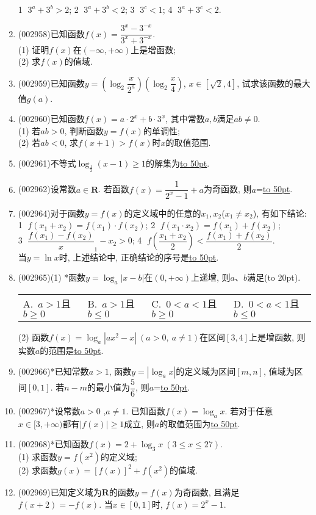 \documentclass[10pt,a4paper]{article}
\newcommand{\blank}[1]{\underline{\hbox to #1pt{}}}
\newcommand{\bracket}[1]{(\hbox to #1pt{})}
\newcommand{\fourch}[4]{\par\begin{tabular}{p{.23\textwidth}p{.23\textwidth}p{.23\textwidth}p{.23\textwidth}}
A.~#1 &B.~#2& C.~#3& D.~#4
\end{tabular}}
\begin{document}
\begin{enumerate}[1.]
\textcircled{1} $3^a+3^b>2$; \textcircled{2} $3^a+3^b<2$; \textcircled{3} $3^c<1$; \textcircled{4} $3^a+3^c<2$.
\item {\tiny (002958)}已知函数$f(x)=\dfrac{3^x-3^{-x}}{3^x+3^{-x}}$.\\
(1) 证明$f(x)$在$(-\infty,+\infty)$上是增函数;\\
(2) 求$f(x)$的值域.
\item {\tiny (002959)}已知函数$y=(\log_2\dfrac x{2^a})(\log_2\dfrac x4)$, $x\in [\sqrt 2,4]$, 试求该函数的最大值$g(a)$.
\item {\tiny (002960)}已知函数$f(x)=a\cdot 2^x+b\cdot 3^x$, 其中常数$a,b$满足$ab\ne 0$.\\
(1) 若$ab>0$, 判断函数$y=f(x)$的单调性;\\
(2) 若$ab<0$, 求$f(x+1)>f(x)$时$x$的取值范围.
\item {\tiny (002961)}不等式$\log_{\frac 12}(x-1)\ge 1$的解集为\blank{50}.
\item {\tiny (002962)}设常数$a\in \mathbf{R}$. 若函数$f(x)=\dfrac 1{2^x-1}+a$为奇函数, 则$a$=\blank{50}.
\item {\tiny (002964)}对于函数$y=f(x)$的定义域中的任意的$x_1,x_2$($x_1\ne x_2$), 有如下结论:\\
\textcircled{1} $f(x_1+x_2)=f(x_1)\cdot f(x_2)$; \textcircled{2} $f(x_1\cdot x_2)=f(x_1)+f(x_2)$;\\ \textcircled{3} $\dfrac{f(x_1)-f(x_2)}x_1-x_2>0$; \textcircled{4} $f(\dfrac{x_1+x_2}2)<\dfrac{f(x_1)+f(x_2)}2$. 
\\当$y=\ln x$时, 上述结论中, 正确结论的序号是\blank{50}.
\item {\tiny (002965)}(1) *函数$y=\log_a|x-b|$在$(0,+\infty)$上递增, 则$a$、$b$满足\bracket{20}.
\fourch{$a>1$且$b\ge 0$}{$a>1$且$b\le 0$}{$0<a<1$且$b\ge 0$}{$0<a<1$且$b\le 0$}
(2) 函数$f(x)=\log_a|ax^2-x| \ (a>0,\ a\ne 1)$在区间$[3,4]$上是增函数, 则实数$a$的范围是\blank{50}.
\item {\tiny (002966)}*已知常数$a>1$, 函数$y=|\log_ax|$的定义域为区间$[m,n]$, 值域为区间$[0,1]$. 若$n-m$的最小值为$\dfrac 56$, 则$a$=\blank{50}.
\item {\tiny (002967)}*设常数$a>0$ ,$a\ne 1$. 已知函数$f(x)=\log_ax$. 若对于任意$x\in [3,+\infty)$都有$|f(x)|\ge 1$成立, 则$a$的取值范围为\blank{50}.
\item {\tiny (002968)}*已知函数$f(x)=2+\log_3 x\ (3\le x\le 27)$.\\
(1) 求函数$y=f(x^2)$的定义域;\\
(2) 求函数$g(x)={[f(x)]}^2+f(x^2)$的值域.
\item {\tiny (002969)}已知定义域为$\mathbf{R}$的函数$y=f(x)$为奇函数, 且满足$f(x+2)=-f(x)$. 当$x\in [0,1]$时, $f(x)=2^x-1$.\\

\end{enumerate}
\end{document}
